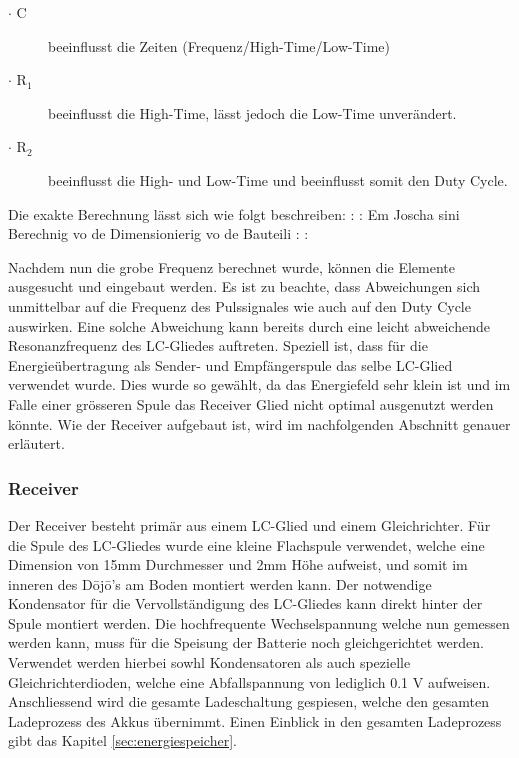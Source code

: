 \begin{description}
	\item [$\cdot$ C] beeinflusst die Zeiten (Frequenz/High-Time/Low-Time)
	\item [$\cdot$ R$_{1}$] beeinflusst die High-Time, lässt jedoch die Low-Time unverändert.
	\item [$\cdot$ R$_{2}$ ] beeinflusst die High- und Low-Time und beeinflusst somit den Duty Cycle.
\end{description}

Die exakte Berechnung lässt sich wie folgt beschreiben:
 \newline
: \newline
: \newline
Em Joscha sini Berechnig vo de Dimensionierig vo de Bauteili
 \newline
: \newline
: \newline
 \newline

Nachdem nun die grobe Frequenz berechnet wurde, können die Elemente ausgesucht und eingebaut werden. Es ist zu beachte, dass Abweichungen sich unmittelbar auf die Frequenz des Pulssignales wie auch auf den Duty Cycle auswirken. Eine solche Abweichung kann bereits durch eine leicht abweichende Resonanzfrequenz des LC-Gliedes auftreten.
\newline
Speziell ist, dass für die Energieübertragung als Sender- und Empfängerspule das selbe LC-Glied verwendet wurde. Dies wurde so gewählt, da das Energiefeld sehr klein ist und im Falle einer grösseren Spule das Receiver Glied nicht optimal ausgenutzt werden könnte. Wie der Receiver aufgebaut ist, wird im nachfolgenden Abschnitt genauer erläutert.

\subsubsection*{Receiver}
Der Receiver besteht primär aus einem LC-Glied und einem Gleichrichter. Für die Spule des LC-Gliedes wurde eine kleine Flachspule verwendet, welche eine Dimension von 15mm Durchmesser und 2mm Höhe aufweist, und somit im inneren des Dōjō’s am Boden montiert werden kann. Der notwendige Kondensator für die Vervollständigung des LC-Gliedes kann direkt hinter der Spule montiert werden. Die hochfrequente Wechselspannung welche nun gemessen werden kann, muss für die Speisung der Batterie noch gleichgerichtet werden. Verwendet werden hierbei sowhl Kondensatoren als auch spezielle Gleichrichterdioden, welche eine Abfallspannung von lediglich 0.1 V aufweisen. Anschliessend wird die gesamte Ladeschaltung gespiesen, welche den gesamten Ladeprozess des Akkus übernimmt. Einen Einblick in den gesamten Ladeprozess gibt das Kapitel \ref{sec:energiespeicher}.


